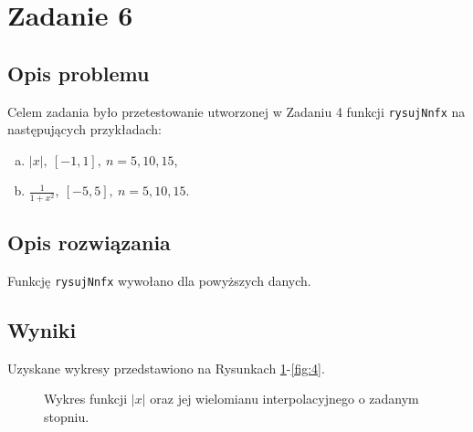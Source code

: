 \documentclass{classrep}
\begin{document}
\section{Zadanie 6}	
	\subsection{Opis problemu}
		Celem zadania było przetestowanie utworzonej w Zadaniu 4 funkcji \texttt{rysujNnfx} na następujących przykładach:
			\begin{enumerate}[(a)]
				\item $|x|,~ [-1,1],~ n = 5, 10, 15$,
				\item $\frac{1}{1+x^2},~ [-5,5],~ n = 5, 10, 15$.
			\end{enumerate}
	\subsection{Opis rozwiązania}
		Funkcję \texttt{rysujNnfx} wywołano dla powyższych danych.
	\subsection{Wyniki}	
		Uzyskane wykresy przedstawiono na Rysunkach \ref{fig:3}-\ref{fig:4}.	
	
		\begin{figure}[!h]
			\centering
			 \hfill
			 \hfill
  			\caption{Wykres funkcji $|x|$ oraz jej wielomianu interpolacyjnego o zadanym stopniu.}
  			\label{fig:3}
		\end{figure}		
	
\end{document}
